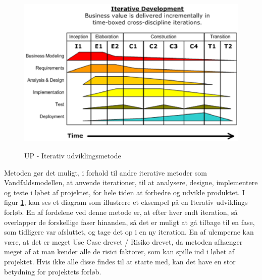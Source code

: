 \begin{figure}[!h]
\centering
\begin{center}
\includegraphics[clip, trim = 0mm 100mm 125mm 10mm, scale = 0.8]{./UPmetode.eps}
\caption{UP - Iterativ udviklingsmetode} \cite{UPmodellen}
\label{dia:Iterativ}
\end{center}
\end{figure}

Metoden gør det muligt, i forhold til andre iterative metoder som Vandfaldsmodellen, at anvende iterationer, til at analysere, designe, implementere og teste i løbet af projektet, for hele tiden at forbedre og udvikle produktet. I figur \ref{dia:Iterativ}, kan ses et diagram som illustrere et eksempel på en Iterativ udviklings forløb. En af fordelene ved denne metode er, at efter hver endt iteration, så overlapper de forskellige faser hinanden, så det er muligt at gå tilbage til en fase, som tidligere var afsluttet, og tage det op i en ny iteration. En af ulemperne kan være, at det er meget Use Case drevet / Risiko drevet, da metoden afhænger meget af at man kender alle de risici faktorer, som kan spille ind i løbet af projektet. Hvis ikke alle disse findes til at starte med, kan det have en stor betydning for projektets forløb.\cite{UPPrincipper}

